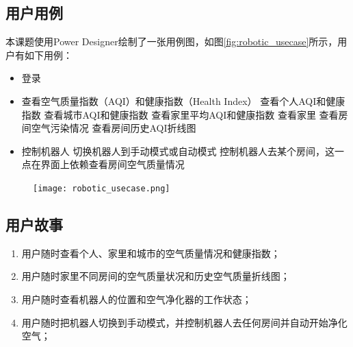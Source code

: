 \subsection{用户用例}
本课题使用Power Designer绘制了一张用例图，如图\ref{fig:robotic_usecase}所示，用户有如下用例：
\begin{itemize}
  \item 登录
  \item 查看空气质量指数（AQI）和健康指数（Health Index）
  \subitem 查看个人AQI和健康指数
  \subitem 查看城市AQI和健康指数
  \subitem 查看家里平均AQI和健康指数
  \subitem 查看家里
  \subsubitem 查看房间空气污染情况
  \subsubitem 查看房间历史AQI折线图
  \item 控制机器人
  \subitem 切换机器人到手动模式或自动模式
  \subitem 控制机器人去某个房间，这一点在界面上依赖查看房间空气质量情况
\end{itemize}
\begin{figure}[!htp]
 \centering
 \texttt{[image: robotic\_usecase.png]}
\end{figure}

\subsection{用户故事}
\begin{enumerate}
  \item 用户随时查看个人、家里和城市的空气质量情况和健康指数；
  \item 用户随时家里不同房间的空气质量状况和历史空气质量折线图；
  \item 用户随时查看机器人的位置和空气净化器的工作状态；
  \item 用户随时把机器人切换到手动模式，并控制机器人去任何房间并自动开始净化空气；
\end{enumerate}
